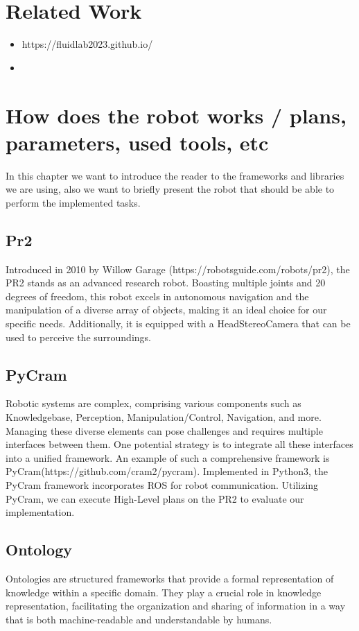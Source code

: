 \documentclass[	pdftex, 
								a4paper,
								11pt, DIV11, BCOR5mm,
								parskip,
								]{scrreprt}
\begin{document}
	\chapter*{Related Work}
	\begin{itemize}
		\item https://fluidlab2023.github.io/
		\item 
	\end{itemize}

	\chapter*{How does the robot works / plans, parameters, used tools, etc}
	In this chapter we want to introduce the reader to the frameworks and libraries we are using, also we want to briefly present the robot that should be able to perform the implemented tasks.
	\section*{Pr2}
	Introduced in 2010 by Willow Garage (https://robotsguide.com/robots/pr2), the PR2 stands as an advanced research robot. Boasting multiple joints and 20 degrees of freedom, this robot excels in autonomous navigation and the manipulation of a diverse array of objects, making it an ideal choice for our specific needs. Additionally, it is equipped with a HeadStereoCamera that can be used to perceive the surroundings.
	\section*{PyCram}
	Robotic systems are complex, comprising various components such as Knowledgebase, Perception, Manipulation/Control, Navigation, and more. Managing these diverse elements can pose challenges and requires multiple interfaces between them. One potential strategy is to integrate all these interfaces into a unified framework. An example of such a comprehensive framework is PyCram(https://github.com/cram2/pycram).
	Implemented in Python3, the PyCram framework incorporates ROS for robot communication. Utilizing PyCram, we can execute High-Level plans on the PR2 to evaluate our implementation.
	\section*{Ontology}
	Ontologies are structured frameworks that provide a formal representation of knowledge within a specific domain. They play a crucial role in knowledge representation, facilitating the organization and sharing of information in a way that is both machine-readable and understandable by humans. 
\end{document}
